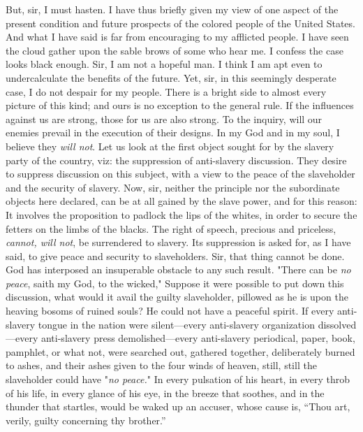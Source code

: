 But, sir, I must hasten. I have thus briefly given my view of one aspect
of the present condition and future prospects of the colored people of
the United States. And what I have said is far from encouraging to my
afflicted people. I have seen the cloud gather upon the sable brows of
some who hear me. I confess the case looks black enough. Sir, I am not a
hopeful man. I think I am apt even to undercalculate the benefits of the
future. Yet, sir, in this seemingly desperate case, I do not despair for
my people. There is a bright side to almost every picture of this kind;
and ours is no exception to the general rule. If the influences against
us are strong, those for us are also strong. To the inquiry, will our
enemies prevail in the execution of their designs. In my God and in my
soul, I believe they \emph{will not}. Let us look at the first object
sought for by the slavery party of the country, viz: the suppression of
anti-slavery discussion. They desire to suppress discussion on this
subject, with a view to the peace of the slaveholder and the security of
slavery. Now, sir, neither the principle nor the subordinate objects
here declared, can be at all gained by the slave power, and for this
reason: It involves the proposition to padlock the lips of the whites,
in order to secure the fetters on the limbs of the blacks. The right of
speech, precious and priceless, \emph{cannot, will not}, be surrendered
to slavery. Its suppression is asked for, as I have said, to give peace
and security to slaveholders. Sir, that thing cannot be done. God has
interposed an insuperable obstacle to any such result. "There can be
\emph{no peace}, saith my God, to the wicked," {}Suppose it were
possible to put down this discussion, what would it avail the guilty
slaveholder, pillowed as he is upon the heaving bosoms of ruined souls?
He could not have a peaceful spirit. If every anti-slavery tongue in the
nation were silent---every anti-slavery organization dissolved---every
anti-slavery press demolished---every anti-slavery periodical, paper,
book, pamphlet, or what not, were searched out, gathered together,
deliberately burned to ashes, and their ashes given to the four winds of
heaven, still, still the slaveholder could have "\emph{no peace.}" In
every pulsation of his heart, in every throb of his life, in every
glance of his eye, in the breeze that soothes, and in the thunder that
startles, would be waked up an accuser, whose cause is, ``Thou art,
verily, guilty concerning thy brother.''

{\protect\hypertarget{ux5cux7bux5cux7bux5cux7b1ux5cux7dux5cux7dux5cux7d}{}{}}

